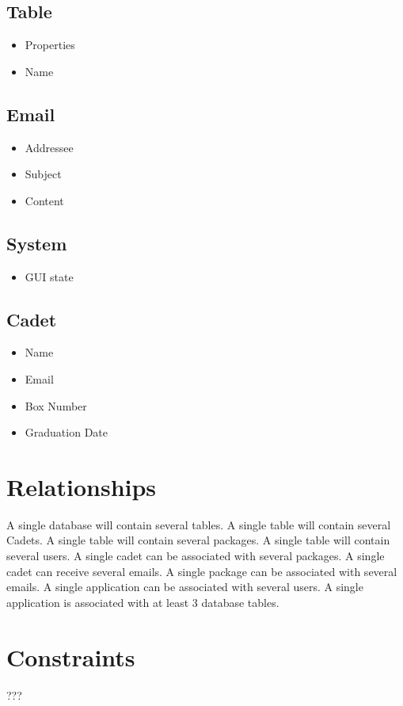 \documentclass[11pt]{article}
\begin{document}
\subsection*{Table}
\label{sec:orgf77cee0}
\begin{itemize}
\item Properties
\item Name
\end{itemize}
\subsection*{Email}
\label{sec:orga1072e2}
\begin{itemize}
\item Addressee
\item Subject
\item Content
\end{itemize}
\subsection*{System}
\label{sec:orgc046103}
\begin{itemize}
\item GUI state
\end{itemize}
\subsection*{Cadet}
\label{sec:org9306f4c}
\begin{itemize}
\item Name
\item Email
\item Box Number
\item Graduation Date
\end{itemize}
\section*{Relationships}
\label{sec:org399f906}
A single database will contain several tables.
A single table will contain several Cadets.
A single table will contain several packages.
A single table will contain several users.
A single cadet can be associated with several packages.
A single cadet can receive several emails.
A single package can be associated with several emails.
A single application can be associated with several users.
A single application is associated with at least 3 database tables.
\section*{Constraints}
\label{sec:org4fc1174}
???
\end{document}
